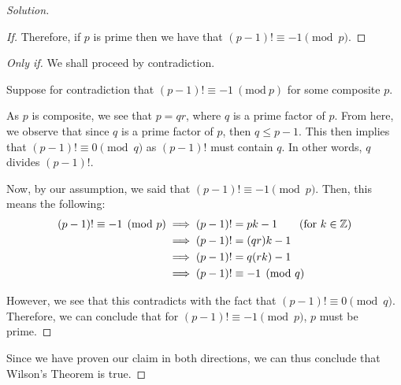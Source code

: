 \documentclass{article}
\newenvironment{solution}{\begin{proof}[Solution]}{\end{proof}}
\newcommand{\Mod}[1]{\ (\mathrm{mod}\ {#1})}
\newcommand{\ZZ}{\mathbb{Z}}
\begin{document}
\begin{solution}
\begin{proof}[If]
		Therefore, if $p$ is prime then we have that $(p-1)! \equiv -1 \pmod p$.
	\end{proof}

	\begin{proof}[Only if]
		We shall proceed by contradiction.
		
		Suppose for contradiction that $(p-1)! \equiv -1 \Mod{p}$ for some composite $p$. 
		
		As $p$ is composite, we see that $p=qr$, where $q$ is a prime factor of $p$. From here, we observe that since $q$ is a prime factor of $p$, then $q \leq p-1$. This then implies that $(p-1)! \equiv 0 \pmod q$ as $(p-1)!$ must contain $q$. In other words, $q$ divides $(p-1)!$.
		
		Now, by our assumption, we said that $(p-1)! \equiv -1 \pmod p$. Then, this means the following:
		\begin{align*}
			(p-1)! \equiv -1 \pmod p &\implies (p-1)! = pk - 1 \tag{for $k \in \ZZ$} \\
			&\implies (p-1)! = (qr)k - 1 \\
			&\implies (p-1)! = q(rk) - 1 \\
			&\implies (p-1)! \equiv -1 \pmod q 
		\end{align*} 
	
		However, we see that this contradicts with the fact that $(p-1)! \equiv 0 \pmod q$. Therefore, we can conclude that for $(p-1)! \equiv -1 \pmod p$, $p$ must be prime.
	\end{proof}

	Since we have proven our claim in both directions, we can thus conclude that Wilson's Theorem is true.
\end{solution}
\end{document}
